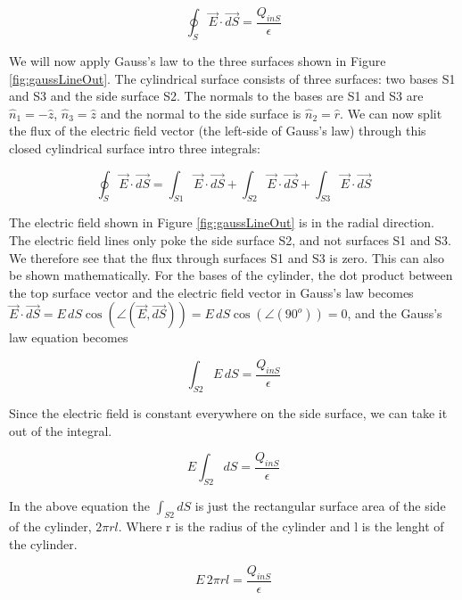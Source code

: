 \documentclass{ximera}
\begin{document}
\begin{equation}
\oint_S \vec{E} \cdot \vec{dS} = \frac{Q_{inS}}{\epsilon}
\end{equation}


We will now apply Gauss's law to the three surfaces shown in Figure  \ref{fig:gaussLineOut}. The cylindrical surface consists of three surfaces: two bases S1 and S3 and the side surface S2. The normals to the bases are S1 and S3 are $\hat{n}_1=-\hat{z}$, $\hat{n}_3=\hat{z}$ and the normal to the side surface is  $\hat{n}_2=\hat{r}$. We can now split the flux of the electric field vector (the left-side of Gauss's law) through this closed cylindrical surface  intro three integrals:


 
\begin{equation}
\oint_S \vec{E} \cdot \vec{dS} = \int_{S1}  \vec{E} \cdot \vec{dS} +\int_{S2}  \vec{E} \cdot \vec{dS}+\int_{S3}  \vec{E} \cdot \vec{dS}
\end{equation}
 
 The electric field shown in Figure \ref{fig:gaussLineOut} is in the radial direction. The electric field lines only poke the side surface S2, and not surfaces S1 and S3. We therefore see that the flux through surfaces S1 and S3 is zero. This can also be shown mathematically. For the bases of the cylinder, the dot product between the top surface vector and the electric field vector in Gauss's law becomes $\vec{E} \cdot \vec{dS}= E \,dS  \cos(\angle(\vec{E},\vec{dS}))= E \,dS  \cos(\angle(90^o)) = 0$, and the Gauss's law equation becomes 

\begin{equation}
\int_{S2} E \,dS  = \frac{Q_{inS}}{\epsilon}
\end{equation}

Since the electric field is constant everywhere on the side surface, we can take it out of the integral. 


\begin{equation}
 E \int_{S2} dS = \frac{Q_{inS}}{\epsilon}
\end{equation}

In the above equation the $\int_{S2} dS $ is just the rectangular surface area of the side of the cylinder, $2 \pi r l$. Where r is the radius of the cylinder and l is the lenght of the cylinder.



\begin{equation}
 E \, 2 \pi r l = \frac{Q_{inS}}{\epsilon}
\end{equation}
\end{document}
